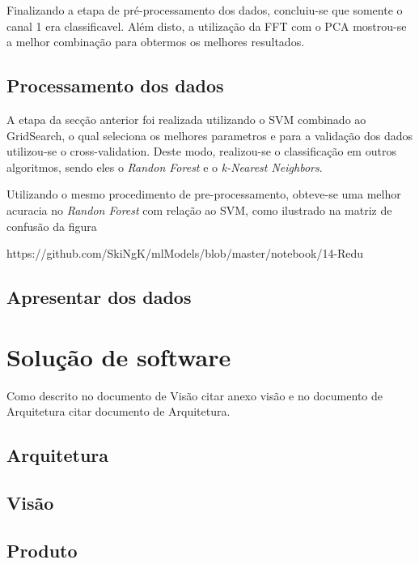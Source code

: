 Finalizando a etapa de pré-processamento dos dados, concluiu-se que somente o canal 1 era classificavel. Além disto, a utilização da FFT com o PCA mostrou-se a melhor combinação para obtermos os melhores resultados.

\subsection{Processamento dos dados}
A etapa da secção anterior foi realizada utilizando o SVM combinado ao GridSearch, o qual seleciona os melhores parametros e para a validação dos dados utilizou-se o cross-validation. Deste modo, realizou-se o classificação em outros algoritmos, sendo eles o \textit{Randon Forest} e o \textit{k-Nearest Neighbors}.

Utilizando o mesmo procedimento de pre-processamento, obteve-se uma melhor acuracia no \textit{Randon Forest} com relação ao SVM, como ilustrado na matriz de confusão da figura {https://github.com/SkiNgK/mlModels/blob/master/notebook/14-Redu%

\subsection{Apresentar dos dados}

\section{Solução de software}
Como descrito no documento de Visão {citar anexo visão} e no documento de Arquitetura { citar documento de Arquitetura}.
\subsection{Arquitetura}

\subsection{Visão}

\subsection{Produto}


}
